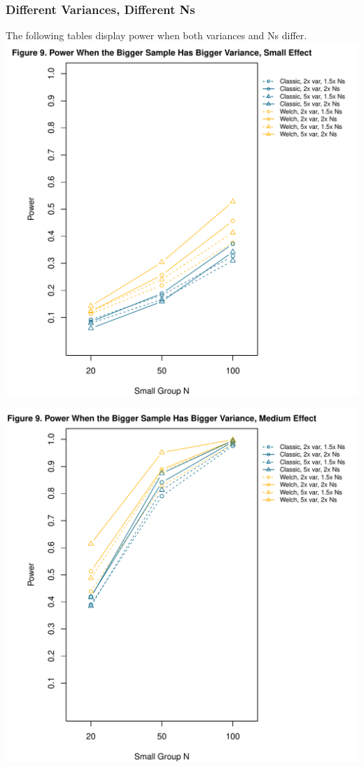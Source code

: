 \documentclass[man]{apa6}\usepackage[]{graphicx}\usepackage[]{color}
\makeatletter
\def\maxwidth{ %
  \ifdim\Gin@nat@width>\linewidth
    \linewidth
  \else
    \Gin@nat@width
  \fi
}
\newenvironment{knitrout}{}{} %
\makeatother
\begin{document}
\subsubsection{Different Variances, Different Ns}
The following tables display power when both variances and Ns differ.
\begin{knitrout}
\color{fgcolor}
\includegraphics[width=\maxwidth]{figure/ssv_power1} 

\includegraphics[width=\maxwidth]{figure/ssv_power2} 


\end{knitrout}
\end{document}
